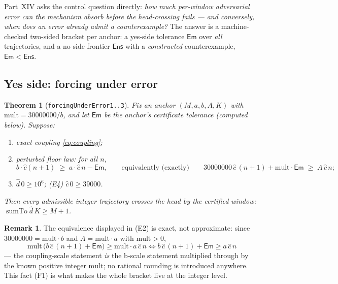 \documentclass[11pt]{article}
\newcommand{\dhat}{\widehat{d}}
\newcommand{\chat}{\widehat{c}}
\newcommand{\sumto}{\operatorname{sumTo}}
\theoremstyle{plain}
\newtheorem{theorem}[lemma]{Theorem}
\theoremstyle{definition}
\newtheorem{remark}[lemma]{Remark}
\begin{document}
Part~XIV asks the control question directly: \emph{how much per-window adversarial error
can the mechanism absorb before the head-crossing fails --- and conversely, when does an
error already admit a counterexample?} The answer is a machine-checked two-sided bracket
per anchor: a yes-side tolerance $\mathsf{Em}$ over \emph{all} trajectories, and a no-side
frontier $\mathsf{Ens}$ with a \emph{constructed} counterexample, $\mathsf{Em}<\mathsf{Ens}$.

\subsection{Yes side: forcing under error}

\begin{theorem}[\texttt{forcingUnderError1..3}]\label{thm:forcing}
Fix an anchor $(M,a,b,A,K)$ with $\mathrm{mult}=30000000/b$, and let $\mathsf{Em}$ be the
anchor's certificate tolerance (computed below). Suppose:
\begin{enumerate}
\item[(E1)] exact coupling \eqref{eq:coupling};
\item[(E2)] \emph{perturbed} floor law: for all $n$,
\begin{equation}\label{eq:pertlaw}
b\cdot\chat(n+1)\;\ge\;a\cdot\chat\,n-\mathsf{Em},
\qquad\text{equivalently (exactly)}\qquad
30000000\,\chat\,(n+1)+\mathrm{mult}\cdot\mathsf{Em}\;\ge\;A\,\chat\,n;
\end{equation}
\item[(E3)] $\dhat\,0\ge 10^{6}$; \qquad (E4) $\chat\,0\ge 39000$.
\end{enumerate}
Then every admissible integer trajectory crosses the head by the certified window:
$\sumto\dhat\,K\ge M+1$.
\end{theorem}

\begin{remark}
The equivalence displayed in (E2) is exact, not approximate: since
$30000000=\mathrm{mult}\cdot b$ and $A=\mathrm{mult}\cdot a$ with $\mathrm{mult}>0$,
\[
\mathrm{mult}\,\bigl(b\,\chat\,(n+1)+\mathsf{Em}\bigr)\ge \mathrm{mult}\cdot a\,\chat\,n
\iff b\,\chat\,(n+1)+\mathsf{Em}\ge a\,\chat\,n
\]
--- the coupling-scale statement \emph{is} the b-scale statement multiplied through by the
known positive integer $\mathrm{mult}$; no rational rounding is introduced anywhere.
This fact ($\mathrm{F1}$) is what makes the whole bracket live at the integer level.
\end{remark}
\end{document}
